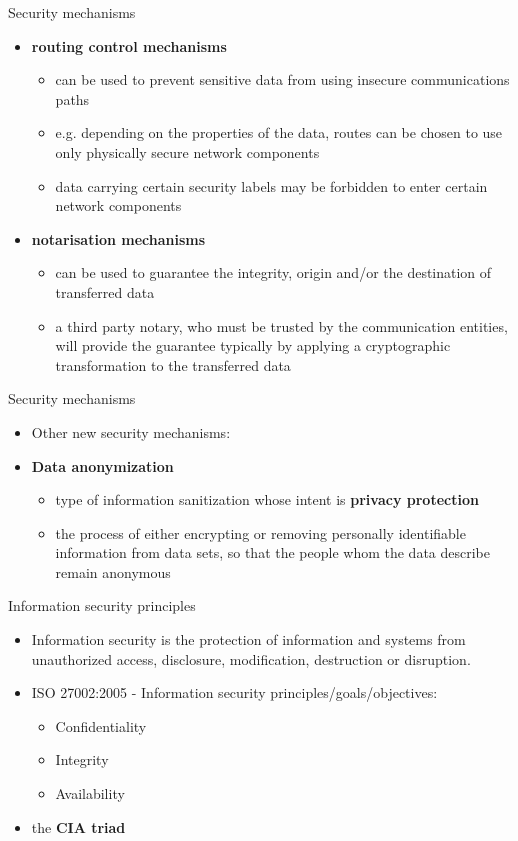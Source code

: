 \documentclass[pdf]{beamer}
\begin{document}
\begin{frame}{Security mechanisms}
\begin{itemize}
\item
\textbf{routing control mechanisms}
\begin{itemize}
\item
can be used to prevent sensitive data from using
insecure communications paths
\item
e.g. depending on the properties of the data, routes can be chosen to use only physically secure network components
\item
data carrying certain security labels may be forbidden to enter certain network components
\end{itemize}
\item
\textbf{notarisation mechanisms}
\begin{itemize}
\item
can be used to guarantee the integrity, origin and/or
the destination of transferred data
\item
a third party notary, who must be trusted by the communication entities, will provide the guarantee typically by applying a
cryptographic transformation to the transferred data
\end{itemize}
\end{itemize}
\end{frame}



\begin{frame}{Security mechanisms}
\begin{itemize}
\item
Other new security mechanisms:
\item
\textbf{Data anonymization}
\begin{itemize}
\item
type of information sanitization whose intent is \textbf{privacy protection}
\item
the process of either encrypting or removing personally identifiable information from data sets, so that the people whom the data describe remain anonymous
\end{itemize}
\end{itemize}
\end{frame}



\begin{frame}{Information security principles}
\begin{itemize}
\item
Information security is the protection of information and systems from unauthorized access, disclosure, modification, destruction or disruption.
\item
ISO 27002:2005 - Information security principles/goals/objectives:
\begin{itemize}
\item
Confidentiality
\item
Integrity
\item
Availability
\end{itemize}
\item
the \textbf{CIA triad}
\end{itemize}
\end{frame}
\end{document}
